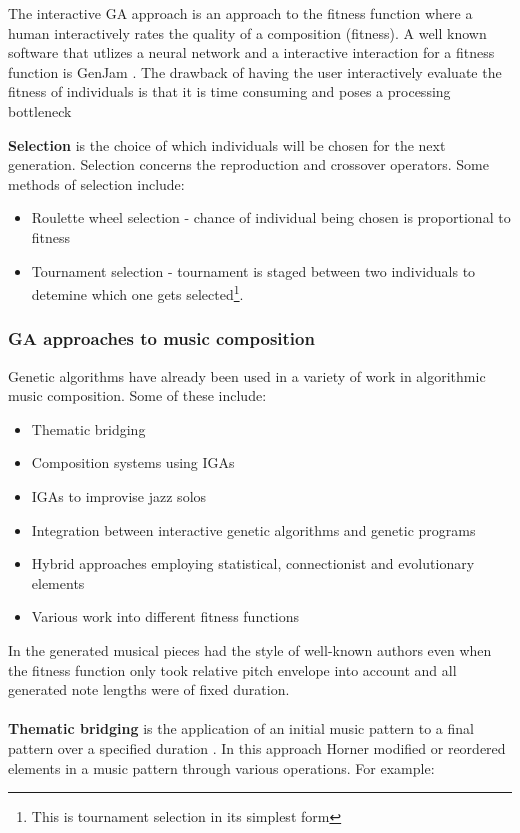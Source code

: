 The interactive GA approach is an approach to the fitness function where a human interactively rates the quality of a composition (fitness). A well known software that utlizes a neural network and a interactive interaction for a fitness function is GenJam \cite{Biles1996}. The drawback of having the user interactively evaluate the fitness of individuals is that it is time consuming and poses a processing bottleneck \cite{Eck2002}

\textbf{Selection} is the choice of which individuals will be chosen for the next generation. Selection concerns the reproduction and crossover operators. Some methods of selection include: 
\begin{itemize}
\item Roulette wheel selection - chance of individual being chosen is proportional to fitness
\item Tournament selection - tournament is staged between two individuals to detemine which one gets selected\footnote{This is tournament selection in its simplest form}.
\end{itemize}

\subsubsection{GA approaches to music composition}

Genetic algorithms have already been used in a variety of work in algorithmic music composition. Some of these include:
\begin{itemize}
\item Thematic bridging \cite{Horner1991}
\item Composition systems using \acsp{IGA} \cite{1412045}
\item \acsp{IGA} to improvise jazz solos \cite{Biles1996, Biles1994}
\item Integration between interactive genetic algorithms and genetic programs \cite{Tokui2000}
\item Hybrid approaches employing statistical, connectionist and evolutionary elements \cite{Manaris2007}
\item Various work into different fitness functions
\end{itemize}

In \cite{Alfonseca2007} the generated musical pieces had the style of well-known authors even when the fitness function only took relative pitch envelope into account and all generated note lengths were of fixed duration.
\\
\\
\textbf{Thematic bridging} is the application of an initial music pattern to a final pattern over a specified duration \cite{Horner1991}. In this approach Horner modified or reordered elements in a music pattern through various operations. For example:

